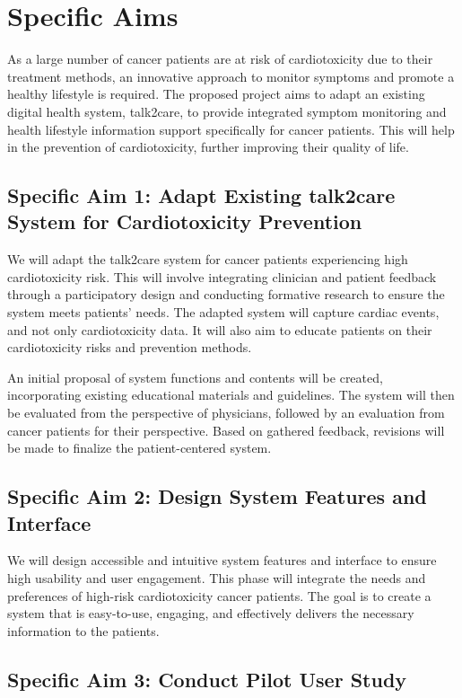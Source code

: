\documentclass[11pt]{article}
\begin{document}
{
  \hfill
  \textbf{}
  \hfill
}

\section*{Specific Aims}

As a large number of cancer patients are at risk of cardiotoxicity due to their treatment methods, an innovative approach to monitor symptoms and promote a healthy lifestyle is required. The proposed project aims to adapt an existing digital health system, talk2care, to provide integrated symptom monitoring and health lifestyle information support specifically for cancer patients. This will help in the prevention of cardiotoxicity, further improving their quality of life.

\subsection*{Specific Aim 1: Adapt Existing talk2care System for Cardiotoxicity Prevention}
We will adapt the talk2care system for cancer patients experiencing high cardiotoxicity risk. This will involve integrating clinician and patient feedback through a participatory design and conducting formative research to ensure the system meets patients' needs. The adapted system will capture cardiac events, and not only cardiotoxicity data. It will also aim to educate patients on their cardiotoxicity risks and prevention methods.

An initial proposal of system functions and contents will be created, incorporating existing educational materials and guidelines. The system will then be evaluated from the perspective of physicians, followed by an evaluation from cancer patients for their perspective. Based on gathered feedback, revisions will be made to finalize the patient-centered system.

\subsection*{Specific Aim 2: Design System Features and Interface}
We will design accessible and intuitive system features and interface to ensure high usability and user engagement. This phase will integrate the needs and preferences of high-risk cardiotoxicity cancer patients. The goal is to create a system that is easy-to-use, engaging, and effectively delivers the necessary information to the patients.

\subsection*{Specific Aim 3: Conduct Pilot User Study} 
\end{document}
